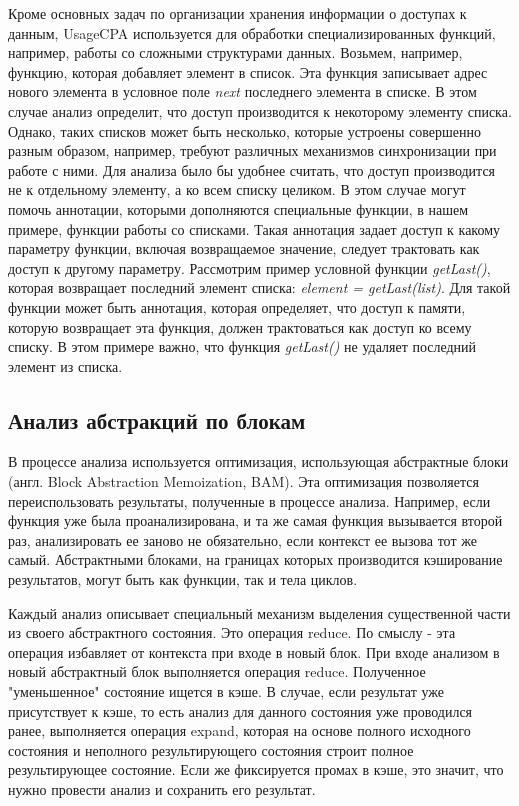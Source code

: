 Кроме основных задач по организации хранения информации о доступах к данным, UsageCPA используется для обработки специализированных функций, например, работы со сложными структурами данных.
Возьмем, например, функцию, которая добавляет элемент в список.
Эта функция записывает адрес нового элемента в условное поле \textit{next} последнего элемента в списке.
В этом случае анализ определит, что доступ производится к некоторому элементу списка.
Однако, таких списков может быть несколько, которые устроены совершенно разным образом, например, требуют различных механизмов синхронизации при работе с ними. 
Для анализа было бы удобнее считать, что доступ производится не к отдельному элементу, а ко всем списку целиком. 
В этом случае могут помочь аннотации, которыми дополняются специальные функции, в нашем примере, функции работы со списками.
Такая аннотация задает доступ к какому параметру функции, включая возвращаемое значение, следует трактовать как доступ к другому параметру.
Рассмотрим пример условной функции \textit{getLast()}, которая возвращает последний элемент списка: \textit{element = getLast(list)}.
Для такой функции может быть аннотация, которая определяет, что доступ к памяти, которую возвращает эта функция, должен трактоваться как доступ ко всему списку. 
В этом примере важно, что функция \textit{getLast()} не удаляет последний элемент из списка.

\subsection{Анализ абстракций по блокам} \label{subsect_impl_bam}

В процессе анализа используется оптимизация, использующая абстрактные блоки (англ. Block Abstraction Memoization, BAM). 
Эта оптимизация позволяется переиспользовать результаты, полученные в процессе анализа.
Например, если функция уже была проанализирована, и та же самая функция вызывается второй раз, анализировать ее заново не обязательно, если контекст ее вызова тот же самый.
Абстрактными блоками, на границах которых производится кэширование результатов, могут быть как функции, так и тела циклов. 

Каждый анализ описывает специальный механизм выделения существенной части из своего абстрактного состояния. Это операция reduce. 
По смыслу - эта операция избавляет от контекста при входе в новый блок.
При входе анализом в новый абстрактный блок выполняется операция reduce. Полученное "уменьшенное" состояние ищется в кэше.
В случае, если результат уже присутствует к кэше, то есть анализ для данного состояния уже проводился ранее, выполняется операция expand, которая на основе полного исходного состояния и неполного результирующего состояния строит полное результирующее состояние. 
Если же фиксируется промах в кэше, это значит, что нужно провести анализ и сохранить его результат. 

